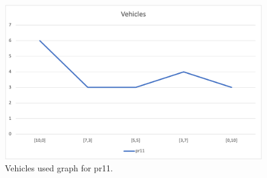 \begin{figure}[H]
    \centering
    \includegraphics[height=0.25\textheight]{../graphs/pr11-vehicles.png}
    \caption{Vehicles used graph for pr11.}
\end{figure}

\newpage